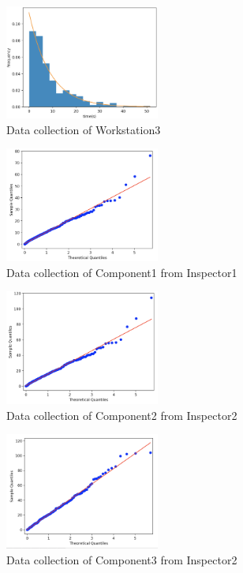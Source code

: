 \documentclass{article}
\begin{document}
\begin{figure}[htbp]
\begin{center}
\includegraphics[width=2in]{dataCollection6.png}
\caption{Data collection of Workstation3}
\label{data1}
\end{center}
\end{figure}




\begin{figure}[htbp]
\begin{center}
\includegraphics[width=2in]{hist1.png}
\caption{Data collection of Component1 from Inspector1}
\label{data1}
\end{center}
\end{figure}

\begin{figure}[htbp]
\begin{center}
\includegraphics[width=2in]{hist2.png}
\caption{Data collection of Component2 from Inspector2}
\label{data2}
\end{center}
\end{figure}

\begin{figure}[htbp]
\begin{center}
\includegraphics[width=2in]{hist3.png}
\caption{Data collection of Component3 from Inspector2}
\label{data3}
\end{center}
\end{figure}
\end{document}
